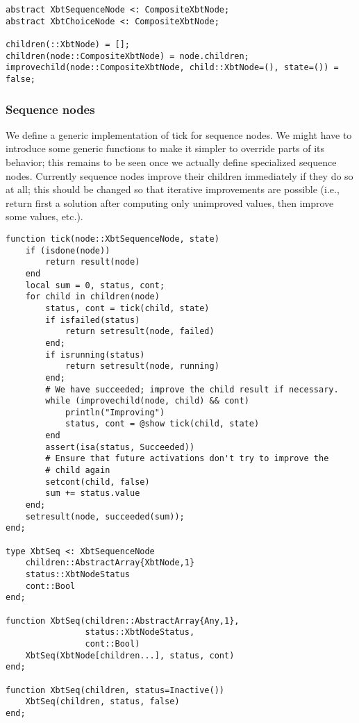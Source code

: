 \documentclass[a4wide]{article}
\begin{document}
\begin{verbatim}
abstract XbtSequenceNode <: CompositeXbtNode;
abstract XbtChoiceNode <: CompositeXbtNode;

children(::XbtNode) = [];
children(node::CompositeXbtNode) = node.children;
improvechild(node::CompositeXbtNode, child::XbtNode=(), state=()) = false;
\end{verbatim}

\subsubsection{Sequence nodes}
\label{sec-3-5-1}

We define a generic implementation of tick for sequence nodes.
We might have to introduce some generic functions to make it
simpler to override parts of its behavior; this remains to be seen
once we actually define specialized sequence nodes.  Currently
sequence nodes improve their children immediately if they do so at
all; this should be changed so that iterative improvements are
possible (i.e., return first a solution after computing only
unimproved values, then improve some values, etc.).

\begin{verbatim}
function tick(node::XbtSequenceNode, state)
    if (isdone(node))
        return result(node)
    end
    local sum = 0, status, cont;
    for child in children(node)
        status, cont = tick(child, state)
        if isfailed(status)
            return setresult(node, failed)
        end;
        if isrunning(status)
            return setresult(node, running)
        end;
        # We have succeeded; improve the child result if necessary.
        while (improvechild(node, child) && cont)
            println("Improving")
            status, cont = @show tick(child, state)
        end
        assert(isa(status, Succeeded))
        # Ensure that future activations don't try to improve the
        # child again
        setcont(child, false)
        sum += status.value
    end;
    setresult(node, succeeded(sum));
end;

type XbtSeq <: XbtSequenceNode
    children::AbstractArray{XbtNode,1}
    status::XbtNodeStatus
    cont::Bool
end;

function XbtSeq(children::AbstractArray{Any,1},
                status::XbtNodeStatus,
                cont::Bool)
    XbtSeq(XbtNode[children...], status, cont)
end;

function XbtSeq(children, status=Inactive())
    XbtSeq(children, status, false)
end;
\end{verbatim}
\end{document}
